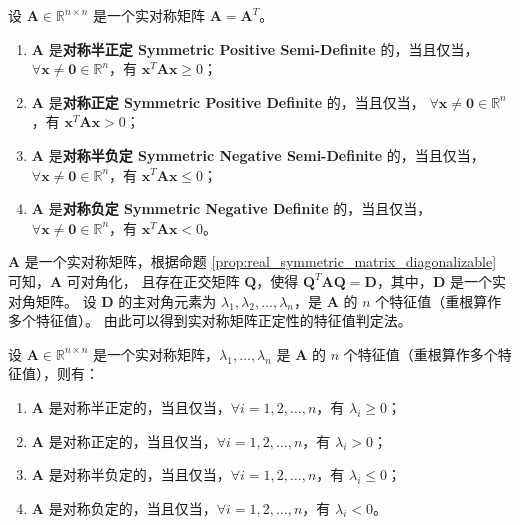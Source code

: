 \vspace{1em}

\begin{definition}
    设 $\mathbf{A}\in \mathbb{R}^{n\times n}$ 是一个实对称矩阵 $\mathbf{A}=\mathbf{A}^T$。
    \begin{enumerate}
        \item $\mathbf{A}$ 是\textbf{对称半正定 Symmetric Positive Semi-Definite} 的，当且仅当，
        $\forall \mathbf{x} \neq \mathbf{0} \in \mathbb{R}^n$，有 $\mathbf{x}^T\mathbf{A}\mathbf{x} \geq 0$；
        \item $\mathbf{A}$ 是\textbf{对称正定 Symmetric Positive Definite} 的，当且仅当，
        $\forall \mathbf{x} \neq \mathbf{0} \in \mathbb{R}^n$，有 $\mathbf{x}^T\mathbf{A}\mathbf{x} > 0$；
        \item $\mathbf{A}$ 是\textbf{对称半负定 Symmetric Negative Semi-Definite} 的，当且仅当，
        $\forall \mathbf{x} \neq \mathbf{0} \in \mathbb{R}^n$，有 $\mathbf{x}^T\mathbf{A}\mathbf{x} \leq 0$；
        \item $\mathbf{A}$ 是\textbf{对称负定 Symmetric Negative Definite} 的，当且仅当，
        $\forall \mathbf{x} \neq \mathbf{0} \in \mathbb{R}^n$，有 $\mathbf{x}^T\mathbf{A}\mathbf{x} < 0$。
    \end{enumerate}
\end{definition}

\begin{note}
    $\mathbf{A}$ 是一个实对称矩阵，根据命题 \ref{prop:real_symmetric_matrix_diagonalizable} 可知，$\mathbf{A}$ 可对角化，
    且存在正交矩阵 $\mathbf{Q}$，使得 $\mathbf{Q}^T \mathbf{A} \mathbf{Q} = \mathbf{D}$，其中，$\mathbf{D}$ 是一个实对角矩阵。
    设 $\mathbf{D}$ 的主对角元素为 $\lambda_1,\lambda_2,\ldots,\lambda_n$，是 $\mathbf{A}$ 的 $n$ 个特征值（重根算作多个特征值）。
    由此可以得到实对称矩阵正定性的特征值判定法。
\end{note}
\vspace{1em}

\begin{proposition}[实对称矩阵的正定性特征值判定法]
    设 $\mathbf{A}\in \mathbb{R}^{n\times n}$ 是一个实对称矩阵，$\lambda_1,\ldots,\lambda_n$ 是 $\mathbf{A}$ 的 $n$ 个特征值（重根算作多个特征值），则有：
    \begin{enumerate}
        \item $\mathbf{A}$ 是对称半正定的，当且仅当，$\forall i=1,2,\ldots,n$，有 $\lambda_i \geq 0$；
        \item $\mathbf{A}$ 是对称正定的，当且仅当，$\forall i=1,2,\ldots,n$，有 $\lambda_i > 0$；
        \item $\mathbf{A}$ 是对称半负定的，当且仅当，$\forall i=1,2,\ldots,n$，有 $\lambda_i \leq 0$；
        \item $\mathbf{A}$ 是对称负定的，当且仅当，$\forall i=1,2,\ldots,n$，有 $\lambda_i < 0$。
    \end{enumerate}
    \label{prop:real_symmetric_matrix_positive_definite}
\end{proposition}

